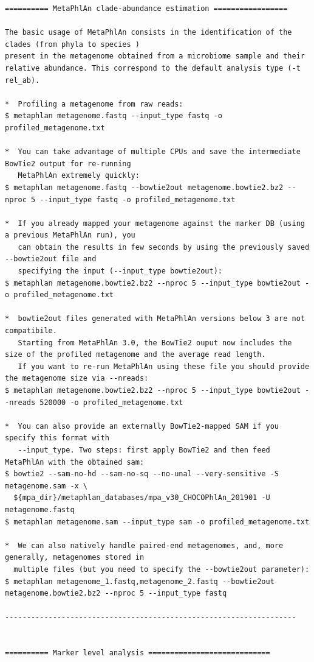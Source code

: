 \documentclass[
  letterpaper,
]{book}
\begin{document}
\begin{verbatim}
========== MetaPhlAn clade-abundance estimation =================

The basic usage of MetaPhlAn consists in the identification of the clades (from phyla to species )
present in the metagenome obtained from a microbiome sample and their
relative abundance. This correspond to the default analysis type (-t rel_ab).

*  Profiling a metagenome from raw reads:
$ metaphlan metagenome.fastq --input_type fastq -o profiled_metagenome.txt

*  You can take advantage of multiple CPUs and save the intermediate BowTie2 output for re-running
   MetaPhlAn extremely quickly:
$ metaphlan metagenome.fastq --bowtie2out metagenome.bowtie2.bz2 --nproc 5 --input_type fastq -o profiled_metagenome.txt

*  If you already mapped your metagenome against the marker DB (using a previous MetaPhlAn run), you
   can obtain the results in few seconds by using the previously saved --bowtie2out file and
   specifying the input (--input_type bowtie2out):
$ metaphlan metagenome.bowtie2.bz2 --nproc 5 --input_type bowtie2out -o profiled_metagenome.txt

*  bowtie2out files generated with MetaPhlAn versions below 3 are not compatibile.
   Starting from MetaPhlAn 3.0, the BowTie2 ouput now includes the size of the profiled metagenome and the average read length.
   If you want to re-run MetaPhlAn using these file you should provide the metagenome size via --nreads:
$ metaphlan metagenome.bowtie2.bz2 --nproc 5 --input_type bowtie2out --nreads 520000 -o profiled_metagenome.txt

*  You can also provide an externally BowTie2-mapped SAM if you specify this format with
   --input_type. Two steps: first apply BowTie2 and then feed MetaPhlAn with the obtained sam:
$ bowtie2 --sam-no-hd --sam-no-sq --no-unal --very-sensitive -S metagenome.sam -x \
  ${mpa_dir}/metaphlan_databases/mpa_v30_CHOCOPhlAn_201901 -U metagenome.fastq
$ metaphlan metagenome.sam --input_type sam -o profiled_metagenome.txt

*  We can also natively handle paired-end metagenomes, and, more generally, metagenomes stored in
  multiple files (but you need to specify the --bowtie2out parameter):
$ metaphlan metagenome_1.fastq,metagenome_2.fastq --bowtie2out metagenome.bowtie2.bz2 --nproc 5 --input_type fastq

-------------------------------------------------------------------


========== Marker level analysis ============================


\end{verbatim}
\end{document}
